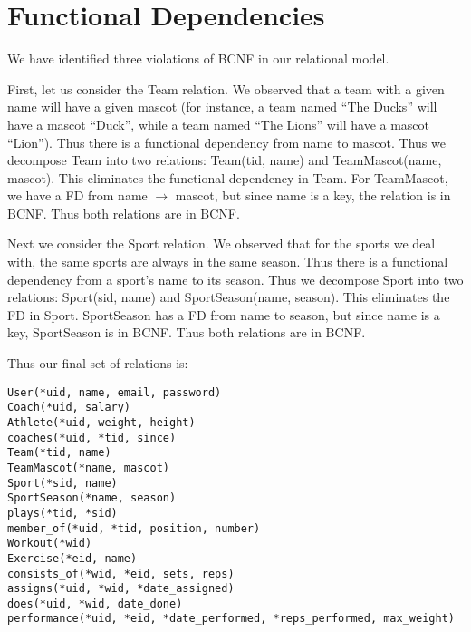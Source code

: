 \documentclass{article}
\begin{document}
\section{Functional Dependencies}

We have identified three violations of BCNF in our relational model. 

First, let us consider the Team relation.  We observed that a team with a given name 
will have a given mascot (for instance, a team named ``The Ducks'' will have a mascot ``Duck'',
while a team named ``The Lions'' will have a mascot ``Lion''). Thus there is a 
functional dependency from name to mascot. Thus we decompose Team into two relations:
Team(tid, name) and TeamMascot(name, mascot). This eliminates the functional dependency
in Team. For TeamMascot, we have a FD from name $\to$ mascot, but since name is a key,
the relation is in BCNF. Thus both relations are in BCNF.

Next we consider the Sport relation. We observed that for the sports we deal with, the same 
sports are always in the same season. Thus there is a functional dependency from a sport's
name to its season. Thus we decompose Sport into two relations: Sport(sid, name) and 
SportSeason(name, season). This eliminates the FD in Sport. SportSeason has a FD from
name to season, but since name is a key, SportSeason is in BCNF. Thus both relations 
are in BCNF. 

Thus our final set of relations is:
    \begin{verbatim}
User(*uid, name, email, password)
Coach(*uid, salary)
Athlete(*uid, weight, height)
coaches(*uid, *tid, since)
Team(*tid, name)
TeamMascot(*name, mascot)
Sport(*sid, name)
SportSeason(*name, season)
plays(*tid, *sid)
member_of(*uid, *tid, position, number)
Workout(*wid)
Exercise(*eid, name)
consists_of(*wid, *eid, sets, reps)
assigns(*uid, *wid, *date_assigned)
does(*uid, *wid, date_done)
performance(*uid, *eid, *date_performed, *reps_performed, max_weight)
    \end{verbatim}
\end{document}
